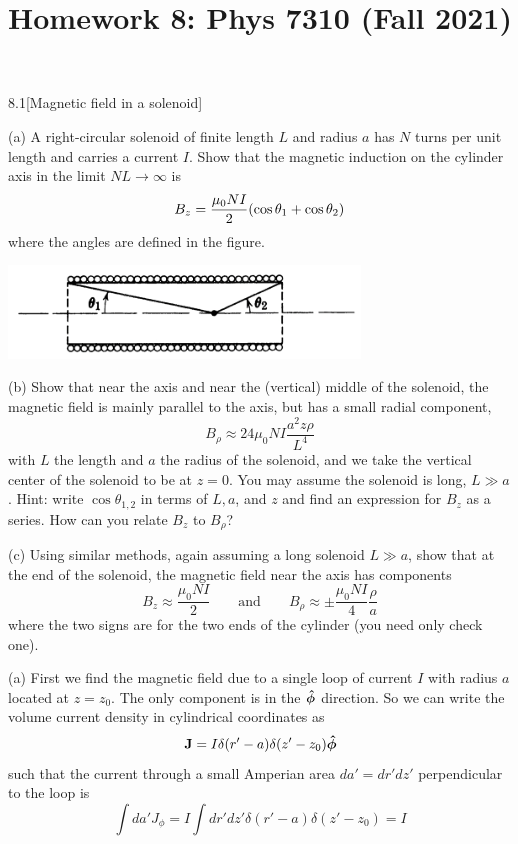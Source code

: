 \documentclass[12pt]{article}
\title{Homework 8: Phys 7310 (Fall 2021)}
\begin{document}
\maketitle
\begin{problem}{8.1}[Magnetic field in a solenoid]

(a) A right-circular solenoid of finite length $L$ and radius $a$ has $N$ turns 
per unit length and carries a current $I$. Show that the magnetic induction on 
the cylinder axis in the limit $NL\to\infty$ is
\begin{equation}
    B_z=\frac{\mu_0NI}{2}\qty(\cos\theta_1+\cos\theta_2) 
\end{equation}
where the angles are defined in the figure.

\begin{center}
    \includegraphics[width=0.7\textwidth]{hw8_p1.jpg} 
\end{center}

(b) Show that near the axis and near the (vertical) middle of the solenoid, the
magnetic field is mainly parallel to the axis, but has a small radial component,
\begin{equation}
    B_\rho\approx 24\mu_0NI\frac{a^2z\rho}{L^4} 
\end{equation}
with $L$ the length and $a$ the radius of the solenoid, and we take the vertical
center of the solenoid to be at $z=0$. You may assume the solenoid is long,
$L\gg a$. Hint: write $\cos\theta_{1,2}$ in terms of $L,a$, and $z$ and find an
expression for $B_z$ as a series. How can you relate $B_z$ to $B_\rho$?

(c) Using similar methods, again assuming a long solenoid $L\gg a$, show that at
the end of the solenoid, the magnetic field near the axis has components
\begin{equation}
    B_z\approx\frac{\mu_0NI}{2}\qquad\text{and}\qquad
    B_\rho\approx\pm\frac{\mu_0NI}{4}\frac{\rho}{a}
\end{equation}
where the two signs are for the two ends of the cylinder (you need only check
one).
\begin{solution}
(a) First we find the magnetic field due to a single loop of current $I$
with radius $a$ located at $z=z_0$. The only component is in the $\bm{\hat{\phi}}$
direction. So we can write the volume current density in cylindrical 
coordinates as
\begin{equation}
    \vb{J}=I\delta(r'-a)\delta(z'-z_0)\bm{\hat{\phi}} 
\end{equation}
such that the current through a small Amperian area $da'=dr'dz'$ perpendicular 
to the loop is
\begin{equation}
    \int da'J_\phi=I\int dr'dz'\delta(r'-a)\delta(z'-z_0)=I
\end{equation}


\end{solution}
\end{problem}
\end{document}
